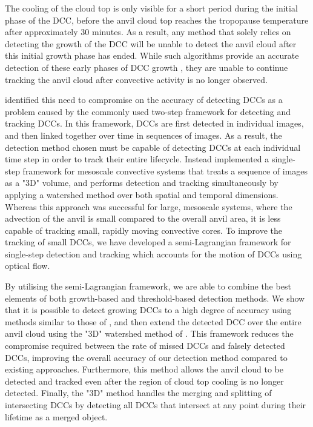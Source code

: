 \documentclass[amt, manuscript]{copernicus}
\begin{document}
The cooling of the cloud top is only visible for a short period during the initial phase of the DCC, before the anvil cloud top reaches the tropopause temperature after approximately 30 minutes.
As a result, any method that solely relies on detecting the growth of the DCC will be unable to detect the anvil cloud after this initial growth phase has ended.
While such algorithms provide an accurate detection of these early phases of DCC growth \citep{zinner_validation_2013}, they are unable to continue tracking the anvil cloud after convective activity is no longer observed.

\citet{fiolleau_algorithm_2013} identified this need to compromise on the accuracy of detecting DCCs as a problem caused by the commonly used two-step framework for detecting and tracking DCCs.
In this framework, DCCs are first detected in individual images, and then linked together over time in sequences of images.
As a result, the detection method chosen must be capable of detecting DCCs at each individual time step in order to track their entire lifecycle.
Instead \citet{fiolleau_algorithm_2013} implemented a single-step framework for mesoscale convective systems that treats a sequence of images as a "3D" volume, and performs detection and tracking simultaneously by applying a watershed method over both spatial and temporal dimensions.
Whereas this approach was successful for large, mesoscale systems, where the advection of the anvil is small compared to the overall anvil area, it is less capable of tracking small, rapidly moving convective cores.
To improve the tracking of small DCCs, we have developed a semi-Lagrangian framework for single-step detection and tracking which accounts for the motion of DCCs using optical flow.

By utilising the semi-Lagrangian framework, we are able to combine the best elements of both growth-based and threshold-based detection methods.
We show that it is possible to detect growing DCCs to a high degree of accuracy using methods similar to those of \citet{zinner_cb-tram:_2008}, and then extend the detected DCC over the entire anvil cloud using the "3D" watershed method of \citet{fiolleau_algorithm_2013}.
This framework reduces the compromise required between the rate of missed DCCs and falsely detected DCCs, improving the overall accuracy of our detection method compared to existing approaches.
Furthermore, this method allows the anvil cloud to be detected and tracked even after the region of cloud top cooling is no longer detected.
Finally, the "3D" method handles the merging and splitting of intersecting DCCs by detecting all DCCs that intersect at any point during their lifetime as a merged object.
\end{document}
